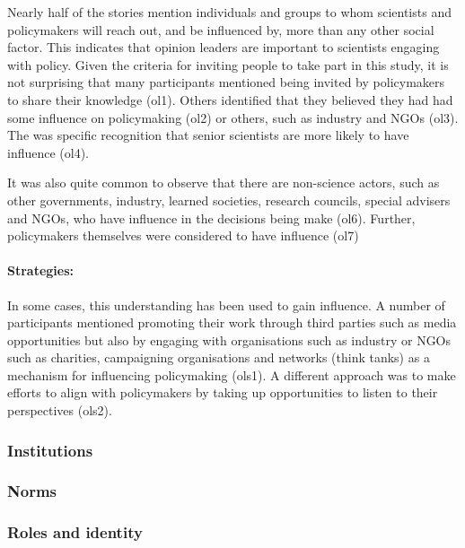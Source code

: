 Nearly half of the stories mention individuals and groups to whom scientists and policymakers will reach out, and be influenced by, more than any other social factor. This indicates that opinion leaders are important to scientists engaging with policy. Given the criteria for inviting people to take part in this study, it is not surprising that many participants mentioned being invited by policymakers to share their knowledge (ol1). Others identified that they believed they had had some influence on policymaking (ol2) or others, such as industry and NGOs (ol3). The was specific recognition that senior scientists are more likely to have influence (ol4).  

It was also quite common to observe that there are non-science actors, such as other governments, industry, learned societies, research councils, special advisers and NGOs, who have influence in the decisions being make (ol6). Further, policymakers themselves were considered to have influence (ol7)

\paragraph{Strategies:}

In some cases, this understanding has been used to gain influence. A number of participants mentioned promoting their work through third parties such as media opportunities but also by engaging with organisations such as industry or NGOs such as charities, campaigning organisations and networks (think tanks) as a mechanism for influencing policymaking (ols1). A different approach was to make efforts to align with policymakers by taking up opportunities to listen to their perspectives (ols2).

\subsubsection{Institutions}\label{sec:resinstitutions}
\subsubsection{Norms}\label{sec:resnorms}
\subsubsection{Roles and identity}\label{sec:resroles}

